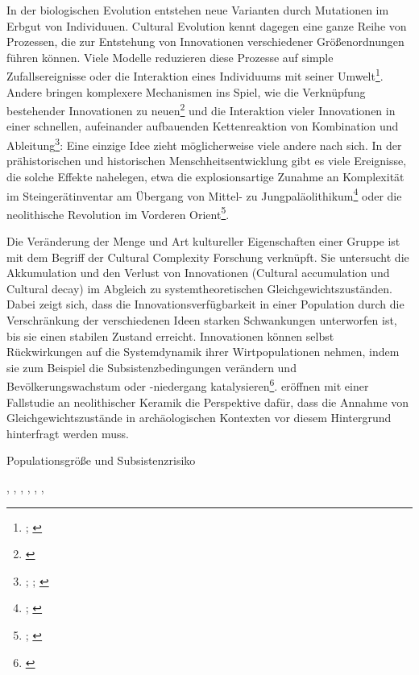 \documentclass[openany,twoside,twocolumn]{book}
\let\rmarkdownfootnote\footnote%
\def\footnote{\protect\rmarkdownfootnote}
\begin{document}
In der biologischen Evolution entstehen neue Varianten durch Mutationen
im Erbgut von Individuuen. Cultural Evolution kennt dagegen eine ganze
Reihe von Prozessen, die zur Entstehung von Innovationen verschiedener
Größenordnungen führen können. Viele Modelle reduzieren diese Prozesse
auf simple Zufallsereignisse oder die Interaktion eines Individuums mit
seiner Umwelt\footnote{\textcite{henrich_evolution_2003};
  \textcite{rendell_why_2010}}. Andere bringen komplexere Mechanismen
ins Spiel, wie die Verknüpfung bestehender Innovationen zu
neuen\footnote{\textcite{enquist_why_2008}} und die Interaktion vieler
Innovationen in einer schnellen, aufeinander aufbauenden Kettenreaktion
von Kombination und Ableitung\footnote{\textcite{fogarty_cultural_2015};
  \textcite{kolodny_evolution_2015};
  \textcite{kolodny_game-changing_2016}}: Eine einzige Idee zieht
möglicherweise viele andere nach sich. In der prähistorischen und
historischen Menschheitsentwicklung gibt es viele Ereignisse, die solche
Effekte nahelegen, etwa die explosionsartige Zunahme an Komplexität im
Steingerätinventar am Übergang von Mittel- zu
Jungpaläolithikum\footnote{\textcite{bar-yosef_nature_1998};
  \textcite{roebroeks_time_2008}} oder die neolithische Revolution im
Vorderen Orient\footnote{\textcite{gopher_when_2001};
  \textcite{veen_agricultural_2010}}.

Die Veränderung der Menge und Art kultureller Eigenschaften einer Gruppe
ist mit dem Begriff der Cultural Complexity Forschung verknüpft. Sie
untersucht die Akkumulation und den Verlust von Innovationen (Cultural
accumulation und Cultural decay) im Abgleich zu systemtheoretischen
Gleichgewichtszuständen. Dabei zeigt sich, dass die
Innovationsverfügbarkeit in einer Population durch die Verschränkung der
verschiedenen Ideen starken Schwankungen unterworfen ist, bis sie einen
stabilen Zustand erreicht\autocite{kolodny_evolution_2015}. Innovationen
können selbst Rückwirkungen auf die Systemdynamik ihrer Wirtpopulationen
nehmen, indem sie zum Beispiel die Subsistenzbedingungen verändern und
Bevölkerungswachstum oder -niedergang katalysieren\footnote{\textcite{kolodny_game-changing_2016}}.
\textcite{crema_revealing_2016} eröffnen mit einer Fallstudie an
neolithischer Keramik die Perspektive dafür, dass die Annahme von
Gleichgewichtszustände in archäologischen Kontexten vor diesem
Hintergrund hinterfragt werden muss.

Populationsgröße und Subsistenzrisiko

\textcite{henrich_demography_2004}, \textcite{collard_what_2011},
\textcite{KobayashiInnovativenesspopulationsize2012},
\textcite{collard_population_2013},
\textcite{BaldiniRevisitingEffectPopulation2015},
\textcite{henrich_understanding_2016}, \textcite{vaesen_population_2016}
\end{document}
